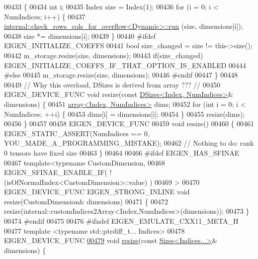 \begin{DoxyCode}
00433     \{
00434       \textcolor{keywordtype}{int} i;
00435       Index size = Index(1);
00436       \textcolor{keywordflow}{for} (i = 0; i < NumIndices; i++) \{
00437         \hyperlink{struct_eigen_1_1internal_1_1check__rows__cols__for__overflow}{internal::check\_rows\_cols\_for\_overflow<Dynamic>::run}
      (size, dimensions[i]);
00438         size *= dimensions[i];
00439       \}
00440 \textcolor{preprocessor}{      #ifdef EIGEN\_INITIALIZE\_COEFFS}
00441         \textcolor{keywordtype}{bool} size\_changed = size != this->size();
00442         m\_storage.resize(size, dimensions);
00443         \textcolor{keywordflow}{if}(size\_changed) EIGEN\_INITIALIZE\_COEFFS\_IF\_THAT\_OPTION\_IS\_ENABLED
00444 \textcolor{preprocessor}{      #else}
00445         m\_storage.resize(size, dimensions);
00446 \textcolor{preprocessor}{      #endif}
00447     \}
00448 
00449     \textcolor{comment}{// Why this overload, DSizes is derived from array ??? //}
00450     EIGEN\_DEVICE\_FUNC \textcolor{keywordtype}{void} resize(\textcolor{keyword}{const} \hyperlink{struct_eigen_1_1_d_sizes}{DSizes<Index, NumIndices>}& dimensions) \{
00451       \hyperlink{class_eigen_1_1array}{array<Index, NumIndices>} dims;
00452       \textcolor{keywordflow}{for} (\textcolor{keywordtype}{int} i = 0; i < NumIndices; ++i) \{
00453         dims[i] = dimensions[i];
00454       \}
00455       resize(dims);
00456     \}
00457 
00458     EIGEN\_DEVICE\_FUNC
00459     \textcolor{keywordtype}{void} resize()
00460     \{
00461       EIGEN\_STATIC\_ASSERT(NumIndices == 0, YOU\_MADE\_A\_PROGRAMMING\_MISTAKE);
00462       \textcolor{comment}{// Nothing to do: rank 0 tensors have fixed size}
00463     \}
00464 
00466 \textcolor{preprocessor}{#ifdef EIGEN\_HAS\_SFINAE}
00467     \textcolor{keyword}{template}<\textcolor{keyword}{typename} CustomDimension,
00468              EIGEN\_SFINAE\_ENABLE\_IF( !(isOfNormalIndex<CustomDimension>::value) )
00469     >
00470     EIGEN\_DEVICE\_FUNC EIGEN\_STRONG\_INLINE \textcolor{keywordtype}{void} resize(CustomDimension& dimensions)
00471     \{
00472       resize(internal::customIndices2Array<Index,NumIndices>(dimensions));
00473     \}
00474 \textcolor{preprocessor}{#endif}
00475 
00476 \textcolor{preprocessor}{#ifndef EIGEN\_EMULATE\_CXX11\_META\_H}
00477     \textcolor{keyword}{template} <\textcolor{keyword}{typename} std::ptrdiff\_t... Indices>
00478     EIGEN\_DEVICE\_FUNC
\hyperlink{class_eigen_1_1_tensor_a4f637a19784e5d0391882bd9fab0917e}{00479}     \textcolor{keywordtype}{void} \hyperlink{class_eigen_1_1_tensor_a4f637a19784e5d0391882bd9fab0917e}{resize}(\textcolor{keyword}{const} \hyperlink{struct_eigen_1_1_sizes}{Sizes<Indices...>}& dimensions) \{

\end{DoxyCode}
